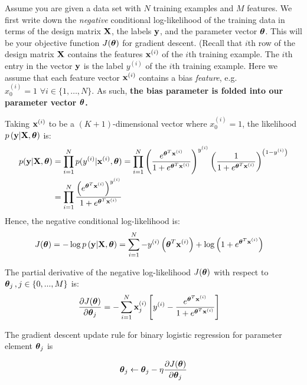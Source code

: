  Assume you are given a data set with $N$ training examples and $M$ features. We first write down the \emph{negative} conditional log-likelihood of the training data in terms of the design matrix $\mathbf{X}$, the labels $\mathbf{y}$, and the parameter vector $\boldsymbol \theta$. This will be your objective function $J(\boldsymbol \theta)$ for gradient descent. 
%
(Recall that $i$th row of the design matrix $\mathbf{X}$ contains the features $\mathbf{x}^{(i)}$ of the $i$th training example. The $i$th entry in the vector $\mathbf{y}$ is the label $y^{(i)}$ of the $i$th training example.  Here we assume that each feature vector $\mathbf{x}^{(i)}$ contains a bias \emph{feature}, e.g. $x_0^{(i)} = 1 \,\,\forall i \in \{1,\ldots,N\}$. As such, \textbf{the bias parameter is folded into our parameter vector $\boldsymbol \theta$.}


Taking $\mathbf x^{\left(i\right)}$ to be a $(K+1)$-dimensional vector where $x^{(i)}_0=1$, the likelihood $p\left(\mathbf y|\mathbf{X},\boldsymbol \theta\right)$ is:
\begin{align}
     p(\mathbf y |\mathbf{X},\boldsymbol \theta) &= \prod_{i = 1}^N p(y^{(i)} | \mathbf x^{(i)}, \boldsymbol \theta) = \prod_{i = 1}^N \left(\frac{e^{\boldsymbol \theta^T\mathbf x^{\left(i\right)}}}{1+e^{\boldsymbol \theta^T\mathbf x^{\left(i\right)}}}\right)^{y^{(i)}}\left(\frac{1}{1+e^{\boldsymbol \theta^T\mathbf x^{\left(i\right)}}}\right)^{\left(1-y^{(i)}\right)}\\
    &= \prod_{i=1}^N \frac{\left(e^{\boldsymbol \theta^T\mathbf x^{\left(i\right)}}\right)^{y^{(i)}}}{1+e^{\boldsymbol \theta^T\mathbf x^{\left(i\right)}}}
\end{align}
Hence, the negative conditional log-likelihood is:
\begin{align}
    J(\boldsymbol \theta)= -\log p\left(\mathbf y|\mathbf{X},\boldsymbol \theta\right) &= \sum_{i=1}^N  -y^{(i)}\left(\boldsymbol \theta^T\mathbf x^{\left(i\right)}\right)+\log\left(1+e^{\boldsymbol \theta^T\mathbf x^{\left(i\right)}}\right)
\end{align}


The partial derivative of the negative log-likelihood $J(\boldsymbol \theta)$ with respect to $\boldsymbol \theta_j \,, j\in\{0,...,M\}$ is:
\begin{align}
    \frac{\partial J(\boldsymbol \theta)}{\partial \boldsymbol \theta_j} &= -\sum_{i=1}^N \mathbf x_j^{\left(i\right)}\left[y^{(i)}-\frac{e^{\boldsymbol \theta^T\mathbf x^{\left(i\right)}}}{1+e^{\boldsymbol \theta^T\mathbf x^{\left(i\right)}}}\right]
\end{align}


The gradient descent update rule  for binary logistic regression for parameter element $\boldsymbol \theta_j$ is

\begin{align}
    \boldsymbol \theta_j \leftarrow \boldsymbol \theta_j - \eta \frac{\partial J(\boldsymbol \theta)}{\partial \boldsymbol \theta_j}
\end{align}


